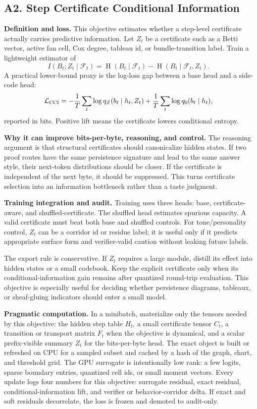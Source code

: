 \documentclass[10pt]{article}
\newcommand{\Ent}{\operatorname{H}}
\newcommand{\loss}{\mathcal{L}}
\numberwithin{equation}{section}
\begin{document}
\subsection{A2. Step Certificate Conditional Information}
\noindent\textbf{Definition and loss.} This objective estimates whether a step-level certificate actually carries predictive information. Let $Z_t$ be a certificate such as a Betti vector, active fan cell, Cox degree, tableau id, or bundle-transition label. Train a lightweight estimator of
\[
I(B_t;Z_t\mid\mathcal F_t)=\Ent(B_t\mid\mathcal F_t)-\Ent(B_t\mid\mathcal F_t,Z_t).
\]
A practical lower-bound proxy is the log-loss gap between a base head and a side-code head:
\[
\loss_{\rm CCI}=-\frac1T\sum_t\log q_Z(b_t\mid h_t,Z_t)+\frac1T\sum_t\log q_0(b_t\mid h_t),
\]
reported in bits. Positive lift means the certificate lowers conditional entropy.

\noindent\textbf{Why it can improve bits-per-byte, reasoning, and control.} The reasoning argument is that structural certificates should canonicalize hidden states. If two proof routes have the same persistence signature and lead to the same answer style, their next-token distributions should be closer. If the certificate is independent of the next byte, it should be suppressed. This turns certificate selection into an information bottleneck rather than a taste judgment.

\noindent\textbf{Training integration and audit.} Training uses three heads: base, certificate-aware, and shuffled-certificate. The shuffled head estimates spurious capacity. A valid certificate must beat both base and shuffled controls. For tone/personality control, $Z_t$ can be a corridor id or residue label; it is useful only if it predicts appropriate surface form and verifier-valid caution without leaking future labels.

The export rule is conservative. If $Z_t$ requires a large module, distill its effect into hidden states or a small codebook. Keep the explicit certificate only when its conditional-information gain remains after quantized round-trip evaluation. This objective is especially useful for deciding whether persistence diagrams, tableaux, or sheaf-gluing indicators should enter a small model.

\noindent\textbf{Pragmatic computation.} In a minibatch, materialize only the tensors needed by this objective: the hidden step table $H_t$, a small certificate tensor $C_t$, a transition or transport matrix $F_t$ when the objective is dynamical, and a scalar prefix-visible summary $Z_t$ for the bits-per-byte head. The exact object is built or refreshed on CPU for a sampled subset and cached by a hash of the graph, chart, and threshold grid. The GPU surrogate is intentionally low rank: a few logits, sparse boundary entries, quantized cell ids, or small moment vectors. Every update logs four numbers for this objective: surrogate residual, exact residual, conditional-information lift, and verifier or behavior-corridor delta. If exact and soft residuals decorrelate, the loss is frozen and demoted to audit-only.
\end{document}
